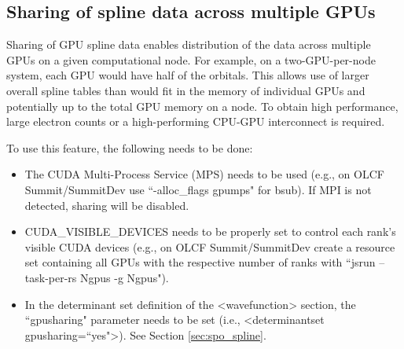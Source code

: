 \subsection{Sharing of spline data across multiple GPUs}

Sharing of GPU spline data enables distribution of the data
across multiple GPUs on a given computational node. For example, on a
two-GPU-per-node system, each GPU would have half of the
orbitals. This allows use of larger overall spline tables than would fit in
the memory of individual GPUs and potentially up to
the total GPU memory on a node. To obtain high performance, large
electron counts or a high-performing CPU-GPU interconnect is required.

To use this feature, the following needs to be done:

\begin{itemize}
    \item The CUDA Multi-Process Service (MPS) needs to be used
      (e.g., on OLCF Summit/SummitDev use ``-alloc\_flags gpumps" for
      bsub). If MPI is not detected, sharing will be disabled.
    \item CUDA\_VISIBLE\_DEVICES needs to be properly set to control each
      rank's visible CUDA devices (e.g., on OLCF Summit/SummitDev create a resource set containing all GPUs with the
      respective number of ranks with ``jsrun --task-per-rs Ngpus -g
      Ngpus").
    \item In the determinant set definition of the <wavefunction>
      section, the ``gpusharing" parameter needs to be set
      (i.e., <determinantset gpusharing=``yes">). See Section \ref{sec:spo_spline}.
\end{itemize}
